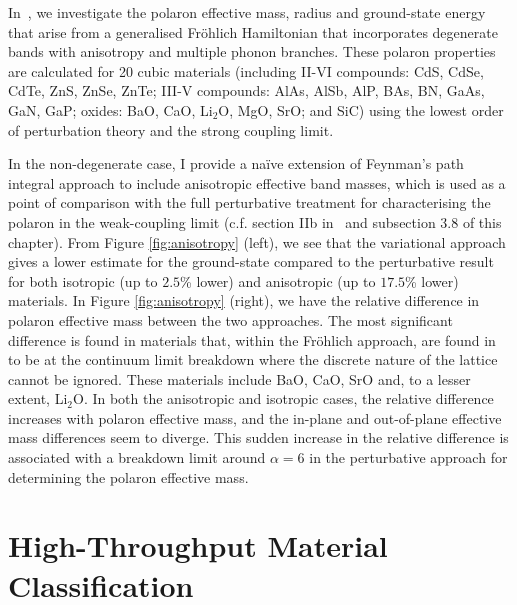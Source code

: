 In~\cite{guster_frohlich_2021}, we investigate the polaron effective mass, radius and ground-state energy that arise from a generalised Fr\"ohlich Hamiltonian that incorporates degenerate bands with anisotropy and multiple phonon branches. These polaron properties are calculated for 20 cubic materials (including II-VI compounds: CdS, CdSe, CdTe, ZnS, ZnSe, ZnTe; III-V compounds: AlAs, AlSb, AlP, BAs, BN, GaAs, GaN, GaP; oxides: BaO, CaO, Li$_2$O, MgO, SrO; and SiC) using the lowest order of perturbation theory and the strong coupling limit. 

In the non-degenerate case, I provide a na\"ive extension of Feynman's path integral approach to include anisotropic effective band masses, which is used as a point of comparison with the full perturbative treatment for characterising the polaron in the weak-coupling limit (c.f. section IIb in~\cite{guster_frohlich_2021} and subsection 3.8 of this chapter). From Figure \ref{fig:anisotropy} (left), we see that the variational approach gives a lower estimate for the ground-state compared to the perturbative result for both isotropic (up to $2.5$\% lower) and anisotropic (up to $17.5$\% lower) materials. In Figure \ref{fig:anisotropy} (right), we have the relative difference in polaron effective mass between the two approaches. The most significant difference is found in materials that, within the Fr\"ohlich approach, are found in~\cite{guster_frohlich_2021} to be at the continuum limit breakdown where the discrete nature of the lattice cannot be ignored. These materials include BaO, CaO, SrO and, to a lesser extent, Li$_2$O. In both the anisotropic and isotropic cases, the relative difference increases with polaron effective mass, and the in-plane and out-of-plane effective mass differences seem to diverge. This sudden increase in the relative difference is associated with a breakdown limit around $\alpha = 6$ in the perturbative approach for determining the polaron effective mass.

\section{High-Throughput Material Classification}
\label{sec:chap-sixth-fourth}